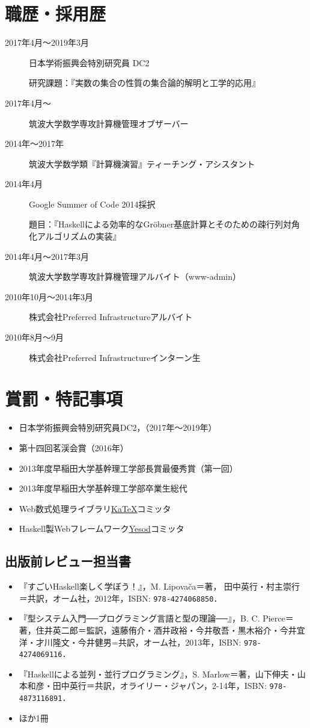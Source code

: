 \documentclass[a4j]{ltjsarticle}
\begin{document}
\section*{職歴・採用歴}
\begin{description}
 \item[2017年4月〜2019年3月]
              日本学術振興会特別研究員 DC2

              研究課題：『実数の集合の性質の集合論的解明と工学的応用』
 \item[2017年4月〜] 筑波大学数学専攻計算機管理オブザーバー
 \item[2014年〜2017年] 筑波大学数学類『計算機演習』ティーチング・アシスタント
 \item[2014年4月] Google Summer of Code 2014採択

            題目：『Haskellによる効率的なGr\"{o}bner基底計算とそのための疎行列対角化アルゴリズムの実装』
 \item[2014年4月〜2017年3月] 筑波大学数学専攻計算機管理アルバイト（www-admin）
 \item[2010年10月〜2014年3月] 株式会社Preferred Infrastructureアルバイト
 \item[2010年8月〜9月] 株式会社Preferred Infrastructureインターン生
\end{description}

\section*{賞罰・特記事項}
\begin{itemize}
 \item 日本学術振興会特別研究員DC2，（2017年〜2019年）
 \item 第十四回茗渓会賞（2016年）
 \item 2013年度早稲田大学基幹理工学部長賞最優秀賞（第一回）
 \item 2013年度早稲田大学基幹理工学部卒業生総代
 \item Web数式処理ライブラリ\href{https://github.com/Khan/KaTeX}{KaTeX}コミッタ
 \item Haskell製Webフレームワーク\href{https://www.yesodweb.com}{Yesod}コミッタ
\end{itemize}

\subsection*{出版前レビュー担当書}
\begin{itemize}
 \item 『すごいHaskell楽しく学ぼう！』，M. Lipova\v{c}a＝著， 田中英行・村主崇行＝共訳，オーム社，2012年，\textsf{ISBN}: \texttt{978-4274068850}．
 \item 『型システム入門──プログラミング言語と型の理論──』，B. C. Pierce＝著，住井英二郎＝監訳，遠藤侑介・酒井政裕・今井敬吾・黒木裕介・今井宜洋・才川隆文・今井健男=共訳，オーム社，2013年，\textsf{ISBN}: \texttt{978-4274069116}．
 \item 『Haskellによる並列・並行プログラミング』，S. Marlow＝著，山下伸夫・山本和彦・田中英行＝共訳，オライリー・ジャパン，2-14年，\textsf{ISBN}: \texttt{978-4873116891}．
 \item ほか1冊
\end{itemize}
\end{document}
